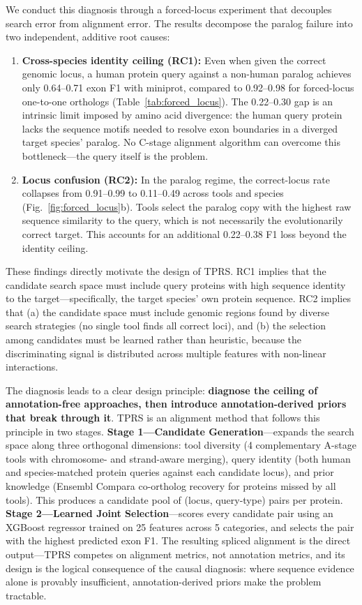 We conduct this diagnosis through a forced-locus experiment that decouples search error from alignment error. The results decompose the paralog failure into two independent, additive root causes:

\begin{enumerate}
\item \textbf{Cross-species identity ceiling (RC1):} Even when given the correct genomic locus, a human protein query against a non-human paralog achieves only 0.64--0.71 exon F1 with miniprot, compared to 0.92--0.98 for forced-locus one-to-one orthologs (Table~\ref{tab:forced_locus}). The 0.22--0.30 gap is an intrinsic limit imposed by amino acid divergence: the human query protein lacks the sequence motifs needed to resolve exon boundaries in a diverged target species' paralog. No C-stage alignment algorithm can overcome this bottleneck---the query itself is the problem.

\item \textbf{Locus confusion (RC2):} In the paralog regime, the correct-locus rate collapses from 0.91--0.99 to 0.11--0.49 across tools and species (Fig.~\ref{fig:forced_locus}b). Tools select the paralog copy with the highest raw sequence similarity to the query, which is not necessarily the evolutionarily correct target. This accounts for an additional 0.22--0.38 F1 loss beyond the identity ceiling.
\end{enumerate}

These findings directly motivate the design of TPRS. RC1 implies that the candidate search space must include query proteins with high sequence identity to the target---specifically, the target species' own protein sequence. RC2 implies that (a) the candidate space must include genomic regions found by diverse search strategies (no single tool finds all correct loci), and (b) the selection among candidates must be learned rather than heuristic, because the discriminating signal is distributed across multiple features with non-linear interactions.

The diagnosis leads to a clear design principle: \textbf{diagnose the ceiling of annotation-free approaches, then introduce annotation-derived priors that break through it}. TPRS is an alignment method that follows this principle in two stages. \textbf{Stage 1---Candidate Generation}---expands the search space along three orthogonal dimensions: tool diversity (4 complementary A-stage tools with chromosome- and strand-aware merging), query identity (both human and species-matched protein queries against each candidate locus), and prior knowledge (Ensembl Compara co-ortholog recovery for proteins missed by all tools). This produces a candidate pool of (locus, query-type) pairs per protein. \textbf{Stage 2---Learned Joint Selection}---scores every candidate pair using an XGBoost regressor trained on 25 features across 5 categories, and selects the pair with the highest predicted exon F1. The resulting spliced alignment is the direct output—TPRS competes on alignment metrics, not annotation metrics, and its design is the logical consequence of the causal diagnosis: where sequence evidence alone is provably insufficient, annotation-derived priors make the problem tractable.


